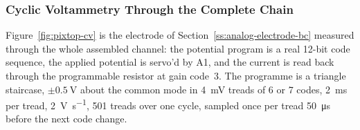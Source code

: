 
\subsubsection{Cyclic Voltammetry Through the Complete Chain}\label{sss:pixtop-cv}

Figure~\ref{fig:pixtop-cv} is the electrode of Section~\ref{ss:analog-electrode-bc}
measured through the whole assembled channel: the potential program is a real
12-bit code sequence, the applied potential is servo'd by A1, and the current
is read back through the programmable resistor at gain code~3. The programme is
a triangle staircase, \(\pm\SI{0.5}{\volt}\) about the common mode in
\SI{4}{\milli\volt} treads of 6 or 7 codes, \SI{2}{\milli\second} per tread,
\SI{2}{\volt\per\second}, 501 treads over one cycle, sampled once per tread
\SI{50}{\micro\second} before the next code change.

